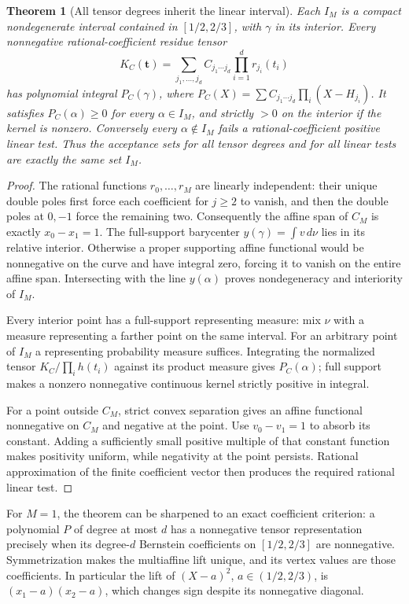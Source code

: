 \documentclass[11pt,a4paper]{article}
\newtheorem{theorem}{Theorem}[section]
\theoremstyle{definition}
\theoremstyle{remark}
\numberwithin{equation}{section}
\begin{document}
\begin{theorem}[All tensor degrees inherit the linear interval]
\label{ar:convextensor}
Each $I_M$ is a compact nondegenerate interval contained in $[1/2,2/3]$,
with $\gamma$ in its interior.  Every nonnegative rational-coefficient
residue tensor
\[
 K_C(\boldsymbol t)=\sum_{j_1,\ldots,j_d}C_{j_1\cdots j_d}
                  \prod_{i=1}^d r_{j_i}(t_i)
\]
has polynomial integral
$P_C(\gamma)$, where
$P_C(X)=\sum C_{j_1\cdots j_d}\prod_i(X-H_{j_i})$.
It satisfies $P_C(\alpha)\ge0$ for every $\alpha\in I_M$, and strictly
$>0$ on the interior if the kernel is nonzero.  Conversely every
$\alpha\notin I_M$ fails a rational-coefficient positive linear test.
Thus the acceptance sets for all tensor degrees and for all linear tests
are exactly the same set $I_M$.
\end{theorem}
\begin{proof}
The rational functions $r_0,\ldots,r_M$ are linearly independent: their
unique double poles first force each coefficient for $j\ge2$ to vanish,
and then the double poles at $0,-1$ force the remaining two.  Consequently
the affine span of $C_M$ is exactly $x_0-x_1=1$.
The full-support barycenter $y(\gamma)=\int v\,d\nu$ lies in its relative
interior.  Otherwise a proper supporting affine functional would be
nonnegative on the curve and have integral zero, forcing it to vanish on
the entire affine span.  Intersecting with the line $y(\alpha)$ proves
nondegeneracy and interiority of $I_M$.

Every interior point has a full-support representing measure: mix $\nu$
with a measure representing a farther point on the same interval.  For
an arbitrary point of $I_M$ a representing probability measure suffices.
Integrating the normalized tensor $K_C/\prod_i h(t_i)$ against its product
measure gives $P_C(\alpha)$; full support makes a nonzero nonnegative
continuous kernel strictly positive in integral.

For a point outside $C_M$, strict convex separation gives an affine
functional nonnegative on $C_M$ and negative at the point.  Use
$v_0-v_1=1$ to absorb its constant.  Adding a sufficiently small positive
multiple of that constant function makes positivity uniform, while
negativity at the point persists.  Rational approximation of the finite
coefficient vector then produces the required rational linear test.
\end{proof}

For $M=1$, the theorem can be sharpened to an exact coefficient criterion:
a polynomial $P$ of degree at most $d$ has a nonnegative tensor
representation precisely when its degree-$d$ Bernstein coefficients on
$[1/2,2/3]$ are nonnegative.  Symmetrization makes the multiaffine lift
unique, and its vertex values are those coefficients.  In particular the
lift of $(X-a)^2$, $a\in(1/2,2/3)$, is $(x_1-a)(x_2-a)$, which changes
sign despite its nonnegative diagonal.
\end{document}
